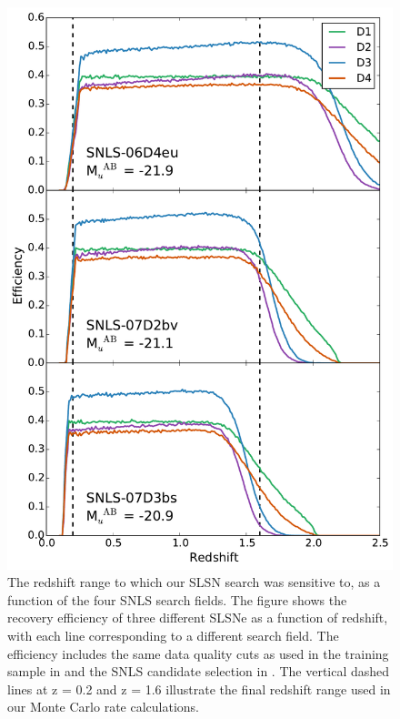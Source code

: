 \begin{figure}
\includegraphics[scale=0.5]{Figures/Chapter3/Efficiency}
\caption{The redshift range to which our SLSN search was sensitive to, as a function of the four SNLS search fields. The figure shows the recovery efficiency of three different SLSNe as a function of redshift, with each line corresponding to a different search field. The efficiency includes the same data quality cuts as used in the training sample in  and the SNLS candidate selection in . The vertical dashed lines at z = 0.2 and z = 1.6 illustrate the final redshift range used in our Monte Carlo rate calculations.}
\label{fig:zrange}
\end{figure}

